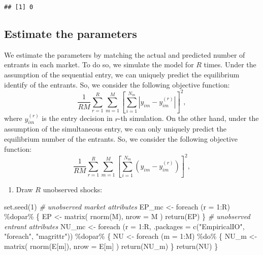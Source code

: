 \documentclass[
]{article}
\newenvironment{Shaded}{\begin{snugshade}}{\end{snugshade}}
\newcommand{\AttributeTok}[1]{\textcolor[rgb]{0.77,0.63,0.00}{#1}}
\newcommand{\CommentTok}[1]{\textcolor[rgb]{0.56,0.35,0.01}{\textit{#1}}}
\newcommand{\DecValTok}[1]{\textcolor[rgb]{0.00,0.00,0.81}{#1}}
\newcommand{\FunctionTok}[1]{\textcolor[rgb]{0.00,0.00,0.00}{#1}}
\newcommand{\NormalTok}[1]{#1}
\newcommand{\OtherTok}[1]{\textcolor[rgb]{0.56,0.35,0.01}{#1}}
\newcommand{\SpecialCharTok}[1]{\textcolor[rgb]{0.00,0.00,0.00}{#1}}
\newcommand{\StringTok}[1]{\textcolor[rgb]{0.31,0.60,0.02}{#1}}
\providecommand{\tightlist}{%
  \setlength{\itemsep}{0pt}\setlength{\parskip}{0pt}}
\begin{document}
\begin{verbatim}
## [1] 0
\end{verbatim}

\hypertarget{estimate-the-parameters}{%
\subsection{Estimate the parameters}\label{estimate-the-parameters}}

We estimate the parameters by matching the actual and predicted number
of entrants in each market. To do so, we simulate the model for \(R\)
times. Under the assumption of the sequential entry, we can uniquely
predict the equilibrium identify of the entrants. So, we consider the
following objective function: \[
\frac{1}{RM}\sum_{r = 1}^R \sum_{m = 1}^M \left[\sum_{i = 1}^{N_m}|y_{im} - y_{im}^{(r)}| \right]^2,
\] where \(y_{im}^{(r)}\) is the entry decision in \(r\)-th simulation.
On the other hand, under the assumption of the simultaneous entry, we
can only uniquely predict the equilibrium number of the entrants. So, we
consider the following objective function: \[
\frac{1}{RM}\sum_{r = 1}^R \sum_{m = 1}^M \left[\sum_{i = 1}^{N_m}(y_{im} - y_{im}^{(r)}) \right]^2,
\]

\begin{enumerate}
\def\labelenumi{\arabic{enumi}.}
\tightlist
\item
  Draw \(R\) unobserved shocks:
\end{enumerate}

\begin{Shaded}
\begin{Highlighting}[]
\FunctionTok{set.seed}\NormalTok{(}\DecValTok{1}\NormalTok{)}
\CommentTok{\# unobserved market attributes}
\NormalTok{EP\_mc }\OtherTok{\textless{}{-}}
  \FunctionTok{foreach}\NormalTok{ (}\AttributeTok{r =} \DecValTok{1}\SpecialCharTok{:}\NormalTok{R) }\SpecialCharTok{\%dopar\%}\NormalTok{ \{}
\NormalTok{    EP }\OtherTok{\textless{}{-}} \FunctionTok{matrix}\NormalTok{(}
      \FunctionTok{rnorm}\NormalTok{(M),}
      \AttributeTok{nrow =}\NormalTok{ M}
\NormalTok{    )}
    \FunctionTok{return}\NormalTok{(EP)}
\NormalTok{\}}
\CommentTok{\# unobserved entrant attributes}
\NormalTok{NU\_mc }\OtherTok{\textless{}{-}}
  \FunctionTok{foreach}\NormalTok{ (}\AttributeTok{r =} \DecValTok{1}\SpecialCharTok{:}\NormalTok{R, }\AttributeTok{.packages =} \FunctionTok{c}\NormalTok{(}\StringTok{"EmpiricalIO"}\NormalTok{, }\StringTok{"foreach"}\NormalTok{, }\StringTok{"magrittr"}\NormalTok{)) }\SpecialCharTok{\%dopar\%}\NormalTok{ \{}
\NormalTok{  NU }\OtherTok{\textless{}{-}}
    \FunctionTok{foreach}\NormalTok{ (}\AttributeTok{m =} \DecValTok{1}\SpecialCharTok{:}\NormalTok{M) }\SpecialCharTok{\%do\%}\NormalTok{ \{}
\NormalTok{      NU\_m }\OtherTok{\textless{}{-}} \FunctionTok{matrix}\NormalTok{(}
        \FunctionTok{rnorm}\NormalTok{(E[m]),}
        \AttributeTok{nrow =}\NormalTok{ E[m]}
\NormalTok{      )}
      \FunctionTok{return}\NormalTok{(NU\_m)}
\NormalTok{    \}}
  \FunctionTok{return}\NormalTok{(NU)}
\NormalTok{\}}
\end{Highlighting}
\end{Shaded}
\end{document}
